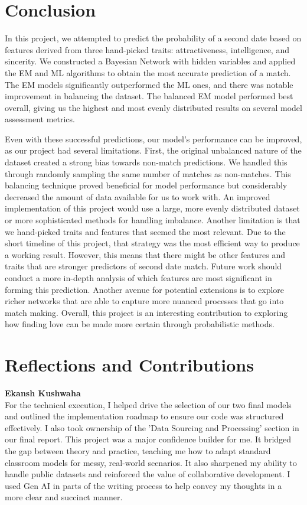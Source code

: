 \documentclass{article}
\begin{document}
\section{Conclusion}
In this project, we attempted to predict the probability of a second date based on features derived from three hand-picked traits: attractiveness, intelligence, and sincerity. We constructed a Bayesian Network with hidden variables and applied the EM and ML algorithms to obtain the most accurate prediction of a match. The EM models significantly outperformed the ML ones, and there was notable improvement in balancing the dataset. The balanced EM model performed best overall, giving us the highest and most evenly distributed results on several model assessment metrics. 

Even with these successful predictions, our model’s performance can be improved, as our project had several limitations. First, the original unbalanced nature of the dataset created a strong bias towards non-match predictions. We handled this through randomly sampling the same number of matches as non-matches. This balancing technique proved beneficial for model performance but considerably decreased the amount of data available for us to work with. An improved implementation of this project would use a large, more evenly distributed dataset or more sophisticated methods for handling imbalance. Another limitation is that we hand-picked traits and features that seemed the most relevant. Due to the short timeline of this project, that strategy was the most efficient way to produce a working result. However, this means that there might be other features and traits that are stronger predictors of second date match. Future work should conduct a more in-depth analysis of which features are most significant in forming this prediction. Another avenue for potential extensions is to explore richer networks that are able to capture more nuanced processes that go into match making. Overall, this project is an interesting contribution to exploring how finding love can be made more certain through probabilistic methods. 

\section{Reflections and Contributions}
\textbf{Ekansh Kushwaha}\\ 
For the technical execution, I helped drive the selection of our two final models and outlined the implementation roadmap to ensure our code was structured effectively. I also took ownership of the 'Data Sourcing and Processing' section in our final report. This project was a major confidence builder for me. It bridged the gap between theory and practice, teaching me how to adapt standard classroom models for messy, real-world scenarios. It also sharpened my ability to handle public datasets and reinforced the value of collaborative development. I used Gen AI in parts of the writing process to help convey my thoughts in a more clear and succinct manner.\\
\end{document}
